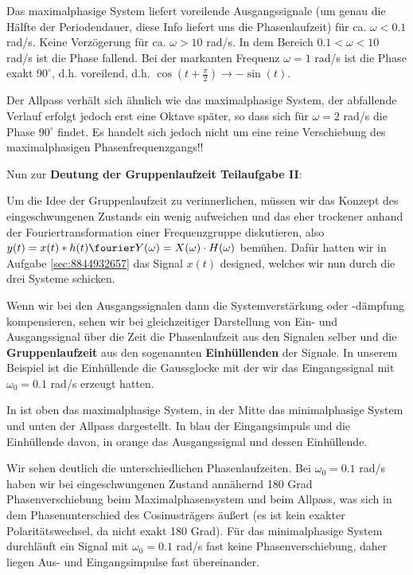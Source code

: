 \begin{Loesung}
Das maximalphasige System liefert voreilende Ausgangssignale (um genau die Hälfte
der Periodendauer, diese Info liefert uns die Phasenlaufzeit) für ca.
$\omega<0.1$ rad/s. Keine Verzögerung für ca. $\omega>10$ rad/s.
In dem Bereich $0.1 < \omega < 10$ rad/s ist die Phase fallend.
Bei der markanten Frequenz $\omega=1$ rad/s ist die Phase exakt $90^\circ$, d.h.
voreilend, d.h. $\cos(t+\frac{\pi}{2})\to -\sin(t)$.

Der Allpass verhält sich ähnlich wie das maximalphasige System, der abfallende
Verlauf erfolgt jedoch erst eine Oktave später, so dass sich für
$\omega=2$ rad/s die Phase $90^\circ$ findet. Es handelt sich jedoch nicht um eine
reine Verschiebung des maximalphasigen Phasenfrequenzgangs!!

Nun zur \textbf{Deutung der Gruppenlaufzeit Teilaufgabe II}:

Um die Idee der Gruppenlaufzeit zu verinnerlichen, müssen wir das Konzept des
eingeschwungenen Zustands ein wenig aufweichen und das eher trockener
anhand der Fouriertransformation einer Frequenzgruppe diskutieren, also
$y(t) = x(t)\ast h(t)\fourier Y(\omega)=X(\omega)\cdot H(\omega)$
bemühen. Dafür hatten wir in Aufgabe \ref{sec:8844932657} das Signal $x(t)$
designed, welches wir nun durch die drei Systeme schicken.

Wenn wir bei den Ausgangssignalen dann die Systemverstärkung oder -dämpfung
kompensieren, sehen wir bei gleichzeitiger Darstellung von Ein- und Ausgangssignal
über die Zeit die Phasenlaufzeit aus den Signalen selber und die \textbf{Gruppenlaufzeit}
aus den sogenannten \textbf{Einhüllenden} der Signale.
In unserem Beispiel ist die Einhüllende die
Gaussglocke mit der wir das Eingangssignal mit $\omega_0=0.1$ rad/s erzeugt hatten.

In  ist oben das maximalphasige System, in
der Mitte das minimalphasige System und unten der Allpass dargestellt. In blau
der Eingangsimpuls und die Einhüllende davon, in orange das Ausgangssignal
und dessen Einhüllende.

Wir sehen deutlich die unterschiedlichen Phasenlaufzeiten. Bei $\omega_0=0.1$ rad/s
haben wir bei eingeschwungenen Zustand annähernd 180 Grad Phasenverschiebung
beim Maximalphasensystem und beim Allpass, was sich in dem Phasenunterschied
des Cosinusträgers äußert (es ist kein exakter Polaritätswechsel, da nicht exakt
180 Grad). Für das minimalphasige System durchläuft ein Signal mit
$\omega_0=0.1$ rad/s fast keine Phasenverschiebung, daher liegen Aus- und Eingangsimpulse
fast übereinander.


\end{Loesung}
